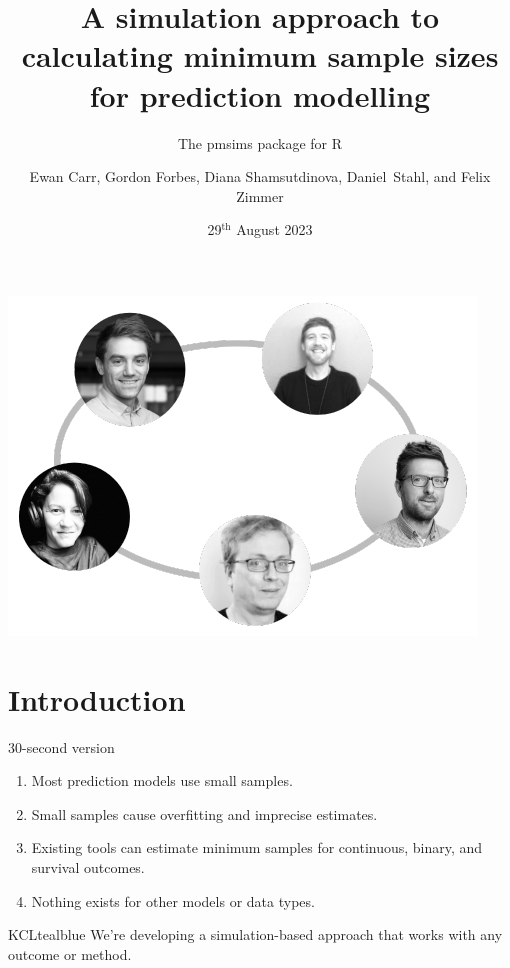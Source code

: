 \documentclass[11pt]{beamer}
\title[The pmsims package for R]{
	A simulation approach to calculating minimum sample sizes for prediction
	modelling
}
\subtitle{The pmsims package for R}
\date{29$^{\text{th}}$ August 2023}
\author[Biostatistics \& Health Informatics, KCL]{%
	Ewan Carr, Gordon Forbes, Diana Shamsutdinova, \mbox{Daniel Stahl},
	and Felix Zimmer}
\institute[]{Department of Biostatistics \& Health Informatics\\ King's College London}
\newcommand{\sgap}{\vspace{0.5em}}
\begin{document}
\maketitle

\begin{frame}[c]
	\vspace{1em}
	\includegraphics[width=\textwidth]{figures/group_photos.pdf}%
\end{frame}

\section{Introduction}

\begin{frame}[c]{30-second version}
	\Large
	\begin{enumerate}
		\setlength{\itemsep}{12pt}

		\item Most prediction models use small samples.

		\item Small samples cause overfitting and imprecise estimates.

		\item Existing tools can estimate minimum samples for continuous,
		      binary, and survival outcomes.

		\item Nothing exists for other models or data types.

	\end{enumerate}

	\sgap

	\begin{cbox}{KCLtealblue}{}
		We're developing a simulation-based approach that works with any
		outcome or method.
	\end{cbox}
	\vspace{-1em}
\end{frame}
\end{document}
